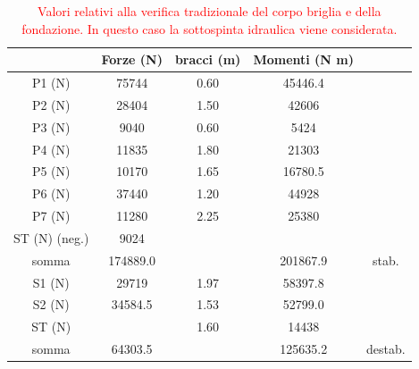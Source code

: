     \begin{table}[H] \centering
        \caption{\textcolor{red}{Valori relativi alla verifica tradizionale del corpo briglia e della fondazione. In questo caso la sottospinta idraulica viene considerata.}}
        \begin{tabular}{ccccc}
            \toprule
           & Forze (N) & bracci (m) & Momenti (N m)    &         \\
    \midrule
        P1 (N)        & 75744    & 0.60 & 45446.4          &         \\
        P2 (N)        & 28404    & 1.50 & 42606            &         \\
        P3 (N)        & 9040     & 0.60 & 5424             &         \\
        P4 (N)        & 11835    & 1.80 & 21303            &         \\
        P5 (N)        & 10170    & 1.65 & 16780.5          &         \\
        P6 (N)        & 37440    & 1.20 & 44928            &         \\
        P7 (N)        & 11280    & 2.25 & 25380            &         \\
        ST (N) (neg.) & 9024     &      &                  &         \\
        somma         & 174889.0 &      & 201867.9         & stab.   \\
       \midrule
        S1 (N)        & 29719    & 1.97 & 58397.8          &         \\
        S2 (N)        & 34584.5  & 1.53 & 52799.0          &         \\
        ST (N)        &          & 1.60 & 14438            &         \\
        somma         & 64303.5  &      & 125635.2         & destab. \\
        \bottomrule
        \end{tabular}
        \end{table}


